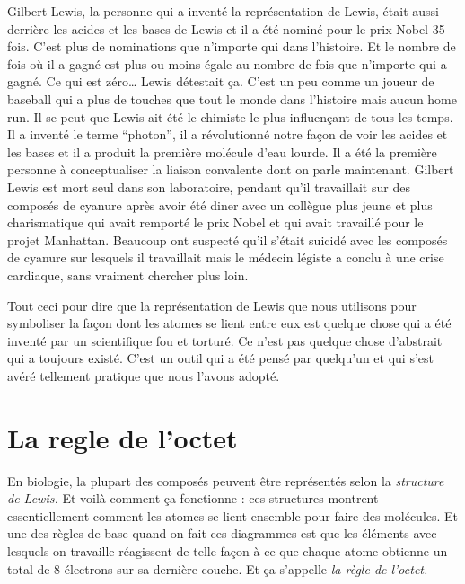 Gilbert Lewis, la personne qui a inventé la représentation de Lewis,
était aussi derrière les acides et les bases de Lewis et il a été nominé
pour le prix Nobel 35 fois. C'est plus de nominations que n'importe qui
dans l'histoire. Et le nombre de fois où il a gagné est plus ou moins
égale au nombre de fois que n'importe qui a gagné. Ce qui est
zéro\ldots{} Lewis détestait ça. C'est un peu comme un joueur de
baseball qui a plus de touches que tout le monde dans l'histoire mais
aucun home run. Il se peut que Lewis ait été le chimiste le plus
influençant de tous les temps. Il a inventé le terme ``photon'', il a
révolutionné notre façon de voir les acides et les bases et il a produit
la première molécule d'eau lourde. Il a été la première personne à
conceptualiser la liaison convalente dont on parle maintenant. Gilbert
Lewis est mort seul dans son laboratoire, pendant qu'il travaillait sur
des composés de cyanure après avoir été diner avec un collègue plus
jeune et plus charismatique qui avait remporté le prix Nobel et qui
avait travaillé pour le projet Manhattan. Beaucoup ont suspecté qu'il
s'était suicidé avec les composés de cyanure sur lesquels il travaillait
mais le médecin légiste a conclu à une crise cardiaque, sans vraiment
chercher plus loin.

Tout ceci pour dire que la représentation de Lewis que nous utilisons
pour symboliser la façon dont les atomes se lient entre eux est quelque
chose qui a été inventé par un scientifique fou et torturé. Ce n'est pas
quelque chose d'abstrait qui a toujours existé. C'est un outil qui a été
pensé par quelqu'un et qui s'est avéré tellement pratique que nous
l'avons adopté.

\hypertarget{la-regle-de-loctet}{%
\section{La regle de l'octet}\label{la-regle-de-loctet}}

En biologie, la plupart des composés peuvent être représentés selon la
\emph{structure de Lewis.} Et voilà comment ça fonctionne : ces
structures montrent essentiellement comment les atomes se lient ensemble
pour faire des molécules. Et une des règles de base quand on fait ces
diagrammes est que les éléments avec lesquels on travaille réagissent de
telle façon à ce que chaque atome obtienne un total de 8 électrons sur
sa dernière couche. Et ça s'appelle \emph{la règle de l'octet.}

